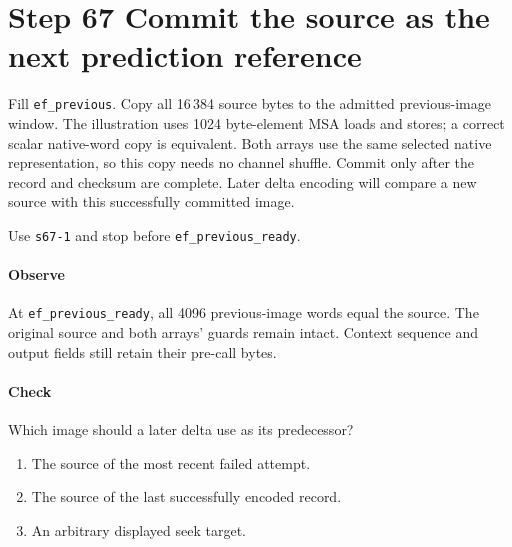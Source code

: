 \section{Step 67 Commit the source as the next prediction reference}
Fill \texttt{ef\_previous}. Copy all 16\,384 source bytes to the admitted previous-image window. The illustration uses 1024 byte-element MSA loads and stores; a correct scalar native-word copy is equivalent. Both arrays use the same selected native representation, so this copy needs no channel shuffle. Commit only after the record and checksum are complete. Later delta encoding will compare a new source with this successfully committed image.

Use \texttt{s67-1} and stop before \texttt{ef\_previous\_ready}.

\paragraph{Observe} At \texttt{ef\_previous\_ready}, all 4096 previous-image words equal the source. The original source and both arrays' guards remain intact. Context sequence and output fields still retain their pre-call bytes.

\paragraph{Check} Which image should a later delta use as its predecessor?
\begin{enumerate}[label=\Alph*.]
  \item The source of the most recent failed attempt.
  \item The source of the last successfully encoded record.
  \item An arbitrary displayed seek target.
\end{enumerate}
